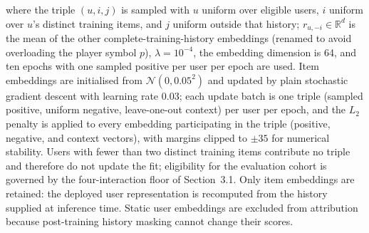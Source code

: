 \documentclass[a4paper,fleqn,doubleblind]{cas-sc}
\begin{document}
where the triple $(u,i,j)$ is sampled with $u$ uniform over eligible users, $i$ uniform over $u$'s distinct training items, and $j$ uniform outside that history; $r_{u,-i}\in\mathbb R^d$ is the mean of the other complete-training-history embeddings (renamed to avoid overloading the player symbol $p$), $\lambda=10^{-4}$, the embedding dimension is 64, and ten epochs with one sampled positive per user per epoch are used. Item embeddings are initialised from $\mathcal{N}(0,0.05^2)$ and updated by plain stochastic gradient descent with learning rate $0.03$; each update batch is one triple (sampled positive, uniform negative, leave-one-out context) per user per epoch, and the $L_2$ penalty is applied to every embedding participating in the triple (positive, negative, and context vectors), with margins clipped to $\pm35$ for numerical stability. Users with fewer than two distinct training items contribute no triple and therefore do not update the fit; eligibility for the evaluation cohort is governed by the four-interaction floor of Section~3.1. Only item embeddings are retained: the deployed user representation is recomputed from the history supplied at inference time. Static user embeddings are excluded from attribution because post-training history masking cannot change their scores.
\end{document}

